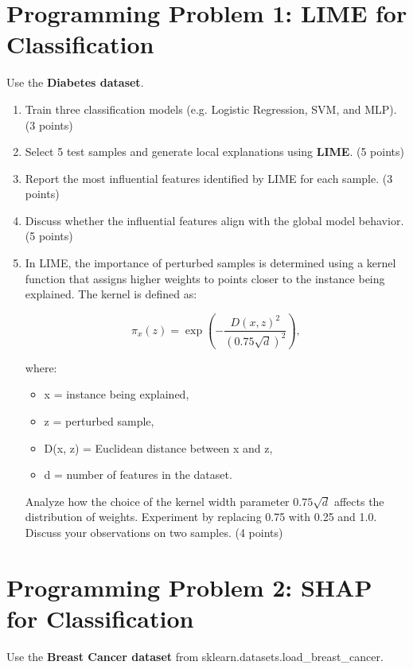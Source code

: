 \documentclass[11pt]{article}
\begin{document}
\section*{Programming Problem 1: LIME for Classification}

Use the \textbf{Diabetes dataset}.

\begin{enumerate}
\item Train three classification models (e.g. Logistic Regression, SVM, and MLP). (3 points)

\item Select 5 test samples and generate local explanations using \textbf{LIME}. (5 points)

\item Report the most influential features identified by LIME for each sample. (3 points)

\item Discuss whether the influential features align with the global model behavior. (5 points)

\item In LIME, the importance of perturbed samples is determined using a kernel function that assigns higher weights to points closer to the instance being explained. The kernel is defined as:

\[
\pi_x(z) = \exp\!\left( - \frac{D(x, z)^2}{(0.75\sqrt{d})^2} \right),
\]

where:
\begin{itemize}
    \item x = instance being explained,
    \item z = perturbed sample,
    \item D(x, z) = Euclidean distance between x and z,
    \item d = number of features in the dataset.
\end{itemize}

Analyze how the choice of the kernel width parameter $0.75\sqrt{d}$ affects the distribution of weights. Experiment by replacing 0.75 with 0.25 and 1.0. Discuss your observations on two samples. (4 points)
\end{enumerate}

\section*{Programming Problem 2: SHAP for Classification}

Use the \textbf{Breast Cancer dataset} from sklearn.datasets.load\_breast\_cancer.
\end{document}
